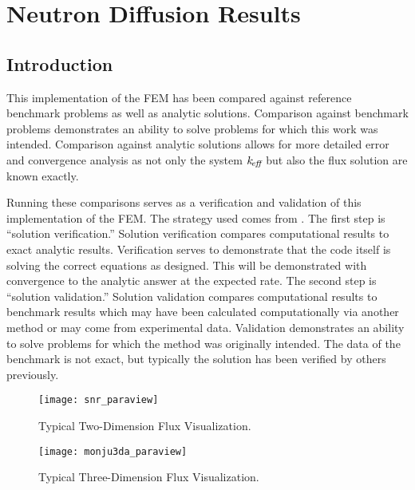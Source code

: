 \chapter{Neutron Diffusion Results}
\label{ch:diffusionResults}

\section{Introduction}
  This implementation of the FEM has been compared against reference 
  benchmark problems as well as analytic solutions. Comparison
  against benchmark problems demonstrates an ability to solve problems for
  which this work was intended. Comparison against analytic solutions 
  allows for more detailed error and convergence analysis as not only the system
  $k_{\!\mbox{\scriptsize \em eff}}$ but also the flux solution are known exactly. 

  Running these comparisons serves as a verification and validation of this
  implementation of the FEM. The strategy used comes from \cite{oberkampf}. The
  first step is ``solution verification.'' Solution verification compares
  computational results to exact analytic results. Verification serves to
  demonstrate that the code itself is solving the correct equations as designed.
  This will be demonstrated with convergence to the analytic answer at the
  expected rate. The second step is ``solution validation.'' Solution validation
  compares computational results to benchmark results which may have been
  calculated computationally via another method or may come from experimental
  data. Validation demonstrates an ability to solve problems for which the
  method was originally intended. The data of the benchmark is not exact, but
  typically the solution has been verified by others previously.

  \begin{figure}
    \centering
    \texttt{[image: snr\_paraview]}
    \caption{Typical Two-Dimension Flux Visualization.}
    \label{fig:snr_paraview}
  \end{figure}

  \begin{figure}
    \centering
    \texttt{[image: monju3da\_paraview]}
    \caption{Typical Three-Dimension Flux Visualization.}
    \label{fig:monju3da_paraview}
  \end{figure}

